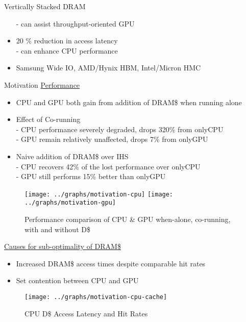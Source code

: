 \documentclass[final,t]{beamer}
\begin{document}
\begin{frame}[t,fragile]{}
\begin{columns}[t]
\begin{column}{.47\linewidth}
\begin{exampleblock}{Vertically Stacked DRAM}
\begin{itemize}
    				\qquad - can assist throughput-oriented GPU
    		\item 20 \% reduction in access latency \\
    				\qquad - can enhance CPU performance
        	\item Samsung Wide IO, AMD/Hynix HBM, Intel/Micron HMC
        \end{itemize}
    \end{exampleblock}
    \begin{exampleblock}{Motivation}
    \centering 
    {\small \underline{Performance}}

    \begin{itemize}
       	\item CPU and GPU both gain from addition of DRAM\$ when running alone
      	\item Effect of Co-running \\
      		\qquad - CPU performance severely degraded, drops 320\% from onlyCPU\\
      		\qquad - GPU remain relatively unaffected, drops 7\% from onlyGPU
      	\item Naive addition of DRAM\$ over IHS \\
      		\qquad - CPU recovers 42\% of the lost performance over onlyCPU \\
      		\qquad - GPU still performs  15\% better than onlyGPU \\
    \end{itemize}
    \begin{figure}
       \texttt{[image: ../graphs/motivation-cpu]}
       \texttt{[image: ../graphs/motivation-gpu]}
       \caption{Performance comparison of CPU \& GPU when-alone, co-running, with and without D\$}
       \label{fig:motivation}
    \end{figure}
    \normalsize \underline{Causes for sub-optimality of DRAM\$}
    \normalsize
    \begin{itemize}
   		\item Increased DRAM\$ access times despite comparable hit rates
        \item Set contention between CPU and GPU
    \end{itemize}
    
    \begin{figure}
       \texttt{[image: ../graphs/motivation-cpu-cache]}
       \caption{CPU D\$ Access Latency and Hit Rates}
       \label{fig:motivation-cpu-cache}
    \end{figure}  
        

\end{exampleblock}
\end{column}
\end{columns}
\end{frame}
\end{document}
